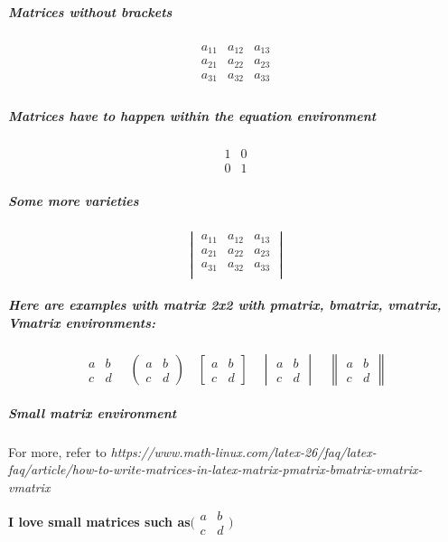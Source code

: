\documentclass[a4paper, 12pt]{article}
\begin{document}
\subparagraph{Matrices without brackets}
\begin{equation*}
   \begin{matrix} 
   a_{11} & a_{12} & a_{13}  \\
   a_{21} & a_{22} & a_{23}  \\
   a_{31} & a_{32} & a_{33}  \\
   \end{matrix} 
\end{equation*}

\subparagraph{Matrices have to happen within the equation environment}
\begin{equation*}
\begin{matrix}
1 & 0\\
0 & 1
\end{matrix}
\end{equation*}

\subparagraph{Some more varieties}
\begin{equation*}
   \begin{vmatrix} 
   a_{11} & a_{12} & a_{13}  \\
   a_{21} & a_{22} & a_{23}  \\
   a_{31} & a_{32} & a_{33}  \\
   \end{vmatrix} 
\end{equation*}

\subparagraph{Here are examples with matrix 2x2 with pmatrix, bmatrix, vmatrix, Vmatrix environments:}
\begin{equation*}
\begin{matrix} 
a & b \\
c & d 
\end{matrix}
\quad  %
\begin{pmatrix} 
a & b \\
c & d 
\end{pmatrix}
\quad
\begin{bmatrix} 
a & b \\
c & d 
\end{bmatrix}
\quad
\begin{vmatrix} 
a & b \\
c & d 
\end{vmatrix}
\quad
\begin{Vmatrix} 
a & b \\
c & d 
\end{Vmatrix}
\end{equation*}

\subparagraph{Small matrix environment} For more, refer to \textsl{https://www.math-linux.com/latex-26/faq/latex-faq/article/how-to-write-matrices-in-latex-matrix-pmatrix-bmatrix-vmatrix-vmatrix} \\
\begin{center}
\textbf{I love small matrices such as$\big(\begin{smallmatrix} a & b\\ c & d \end{smallmatrix}\big)$}
\end{center}
\end{document}
